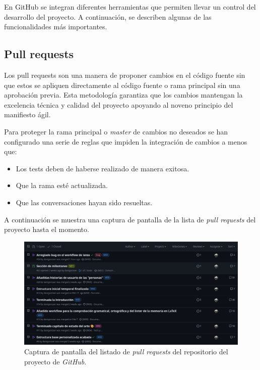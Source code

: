En GitHub se integran diferentes herramientas que permiten llevar un control del desarrollo del proyecto. A continuación, se describen algunas de las funcionalidades más importantes.

\subsection{Pull requests}

Los pull requests son una manera de proponer cambios en el código fuente sin que estos se apliquen directamente al código fuente o rama principal sin una aprobación previa. Esta metodología garantiza que los cambios mantengan la excelencia técnica y calidad del proyecto apoyando al noveno principio del manifiesto ágil.

Para proteger la rama principal o \textit{master} de cambios no deseados se han configurado una serie de reglas que impiden la integración de cambios a menos que:

\begin{itemize}
    \item Los tests deben de haberse realizado de manera exitosa.
    \item Que la rama esté actualizada.
    \item Que las conversaciones hayan sido resueltas.
\end{itemize}

A continuación se muestra una captura de pantalla de la lista de \textit{pull requests} del proyecto hasta el momento.

\begin{figure}[H]
    \caption{Captura de pantalla del listado de \textit{pull requests} del repositorio del proyecto de \textit{GitHub}.}
    \centering
    \vspace*{0.5cm}
    \includegraphics[scale=0.2]{figuras/listado_pull_requests_github.png}
\end{figure}

